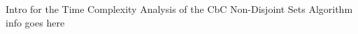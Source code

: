 \documentclass[../../ClusteringConnectionsMAIN.tex]{subfiles}
\begin{document}
\begin{flushleft}
\begin{large}

Intro for the Time Complexity Analysis of the CbC Non-Disjoint Sets Algorithm info goes here


\end{large}
\end{flushleft}
\end{document}
